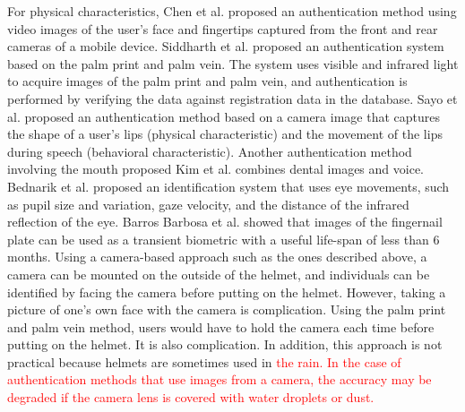 \documentclass[english,preprint,JIP]{ipsj}
\begin{document}
For physical characteristics, Chen et al.\cite{face_and_finger} proposed an authentication method using video images of the user's face and fingertips captured from the front and rear cameras of a mobile device. Siddharth et al.\cite{palm_print} proposed an authentication system based on the palm print and palm vein. The system uses visible and infrared light to acquire images of the palm print and palm vein, and authentication is performed by verifying the data against registration data in the database. Sayo et al.\cite{lip_motion} proposed an authentication method based on a camera image that captures the shape of a user's lips (physical characteristic) and the movement of the lips during speech (behavioral characteristic). Another authentication method involving the mouth proposed Kim et al.\cite{teeth_and_voice} combines dental images and voice. Bednarik et al.\cite{eye_movement} proposed an identification system that uses eye movements, such as pupil size and variation, gaze velocity, and the distance of the infrared reflection of the eye. Barros Barbosa et al.\cite{nail_auth} showed that images of the fingernail plate can be used as a transient biometric with a useful life-span of less than 6 months. Using a camera-based approach such as the ones described above, a camera can be mounted on the outside of the helmet, and individuals can be identified by facing the camera before putting on the helmet. However, taking a picture of one's own face with the camera is complication. 
Using the palm print and palm vein method, users would have to hold the camera each time before putting on the helmet. It is also complication. 
In addition, this approach is not practical because helmets are sometimes used in \textcolor{red}{the rain. In the case of authentication methods that use images from a camera, the accuracy may be degraded if the camera lens is covered with water droplets or dust.}\par
\end{document}
